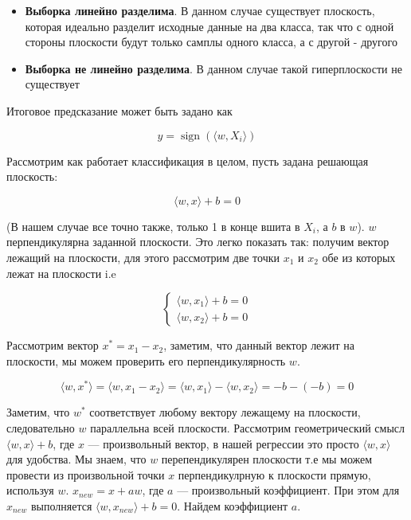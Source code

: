 \documentclass{article}
\begin{document}
    \begin{itemize}
        \item \textbf{Выборка линейно разделима}. В данном случае существует плоскость, которая идеально 
        разделит исходные данные на два класса, так что с одной стороны плоскости будут только самплы одного 
        класса, а с другой - другого 
        \item \textbf{Выборка не линейно разделима}. В данном случае такой гиперплоскости не существует
    \end{itemize}

    Итоговое предсказание может быть задано как 

    \begin{equation}
        y = \operatorname{sign}( \langle w, X_{i} \rangle)
    \end{equation}

    \quad 

    \quad

    Рассмотрим как работает классификация в целом, пусть задана решающая плоскость:

    \begin{equation}
        \langle w, x \rangle + b = 0
    \end{equation}

    (В нашем случае все точно также, только 1 в конце вшита в $X_{i}$, а $b$ в $w$). $w$ перпендикулярна 
    заданной плоскости. Это легко показать так: получим вектор лежащий на плоскости, для этого рассмотрим 
    две точки $x_{1}$ и $x_{2}$ обе из которых лежат на плоскости i.e  

    \[
    \begin{cases}
        \langle w, x_{1} \rangle + b = 0 \\ 
        \langle w, x_{2} \rangle + b = 0
    \end{cases}
    \]

    Рассмотрим вектор $x^{*} = x_{1} - x_{2}$, заметим, что данный вектор лежит на плоскости, 
    мы можем проверить его перпендикулярность $w$.

    \begin{equation}
        \langle w, x^{*} \rangle = \langle w, x_{1} - x_{2} \rangle = \langle w, x_{1} \rangle - \langle w, x_{2} \rangle = -b - (-b) = 0 
    \end{equation}

    Заметим, что $w^{*}$ соответствует любому вектору лежащему на плоскости, следовательно $w$ параллельна всей 
    плоскости. Рассмотрим геометрический смысл $\langle w, x \rangle + b$, где $x$ --- произвольный вектор, в нашей регрессии 
    это просто $\langle w, x \rangle$ для удобства. Мы знаем, что $w$ перепендикулярен плоскости
    т.е мы можем провести из произвольной точки $x$ перпендикулрную к плоскости прямую, используя $w$.
    $x_{new} = x + a w$, где $a$ --- произвольный коэффициент. При этом для $x_{new}$ выполняется 
    $\langle w, x_{new} \rangle + b = 0$. Найдем коэффициент $a$.
\end{document}
